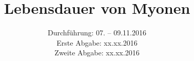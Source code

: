 

\subject{Versuch 01}
\title{Lebensdauer von Myonen}
\date{Durchführung: 07. -- 09.11.2016 \\
      Erste Abgabe: xx.xx.2016 \\
      Zweite Abgabe: xx.xx.2016}



\maketitle
\newpage








\printbibliography


